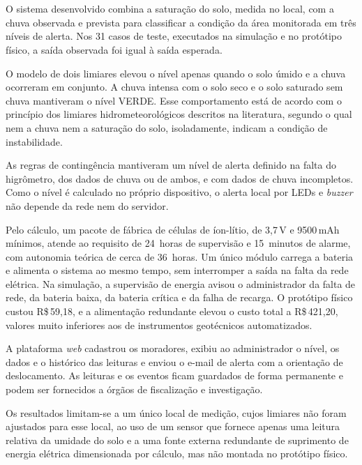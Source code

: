 \chapter*{}
\noindent
{}
\newline
\newline

O sistema desenvolvido combina a saturação do solo, medida no local, com
a chuva observada e prevista para classificar a condição da área monitorada
em três níveis de alerta. Nos 31 casos de teste, executados na simulação
e no protótipo físico, a saída observada foi igual à saída esperada.

O modelo de dois limiares elevou o nível apenas quando o solo úmido e a
chuva ocorreram em conjunto. A chuva intensa com o solo seco e o solo
saturado sem chuva mantiveram o nível VERDE. Esse comportamento está de
acordo com o princípio dos limiares hidrometeorológicos descritos na
literatura, segundo o qual nem a chuva nem a saturação do solo,
isoladamente, indicam a condição de instabilidade.

As regras de contingência mantiveram um nível de alerta definido na
falta do higrômetro, dos dados de chuva ou de ambos, e com dados de
chuva incompletos. Como o nível é calculado no próprio dispositivo, o
alerta local por LEDs e \textit{buzzer} não depende da rede nem do
servidor.

Pelo cálculo, um pacote de fábrica de células de íon-lítio, de 3,7\,V e
9500\,mAh mínimos, atende ao requisito de 24~horas de supervisão e
15~minutos de alarme, com autonomia teórica de cerca de 36~horas. Um
único módulo carrega a bateria e alimenta o sistema ao mesmo tempo, sem
interromper a saída na falta da rede elétrica. Na
simulação, a supervisão de energia avisou o administrador da falta de
rede, da bateria baixa, da bateria crítica e da falha de recarga.
O protótipo físico custou R\$\,59,18, e a alimentação redundante elevou
o custo total a R\$\,421,20, valores muito inferiores aos de instrumentos
geotécnicos automatizados.

A plataforma \textit{web} cadastrou os moradores, exibiu ao
administrador o nível, os dados e o histórico das leituras e enviou o
e-mail de alerta com a orientação de deslocamento. As leituras e os
eventos ficam guardados de forma permanente e podem ser fornecidos a
órgãos de fiscalização e investigação.

Os resultados limitam-se a um único local de medição, cujos limiares
não foram ajustados para esse local, ao uso de um sensor que fornece
apenas uma leitura relativa da umidade do solo e a uma fonte externa
redundante de suprimento de energia elétrica dimensionada por cálculo,
mas não montada no protótipo físico.

